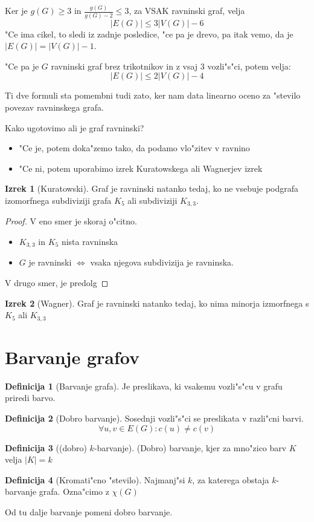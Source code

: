\documentclass{article}
\theoremstyle{definition}
\newtheorem{definition}{Definicija}[section]
\newtheorem{theorem}{Izrek}[section]
\begin{document}
	Ker je $g(G) \geq 3$ in $\frac{g(G)}{g(G)-2} \leq 3$, za VSAK ravninski graf, velja
	$$ |E(G)| \leq 3|V(G)|-6 $$
	"Ce ima cikel, to sledi iz zadnje posledice, "ce pa je drevo, pa itak vemo, da je $|E(G)| = |V(G)| - 1$.
	
	"Ce pa je $G$ ravninski graf brez trikotnikov in z vsaj 3 vozli"s"ci, potem velja:
	$$ |E(G)| \leq 2|V(G)| - 4 $$
	
	Ti dve formuli sta pomembni tudi zato, ker nam data linearno oceno za "stevilo povezav ravninskega grafa.
	
	
	Kako ugotovimo ali je graf ravninski?
	\begin{itemize}
		\item "Ce je, potem doka"zemo tako, da podamo vlo"zitev v ravnino
		\item "Ce ni, potem uporabimo izrek Kuratowskega ali Wagnerjev izrek
	\end{itemize}
	\begin{theorem}[Kuratowski]
		Graf je ravninski natanko tedaj, ko ne vsebuje podgrafa izomorfnega subdiviziji grafa $K_5$ ali subdiviziji $K_{3,3}$.
		\begin{proof}
			V eno smer je skoraj o"citno.
			\begin{itemize}
				\item $K_{3,3}$ in $K_5$ nista ravninska
				\item $G$ je ravninski $\iff$ vsaka njegova subdivizija je ravninska.
			\end{itemize}
			V drugo smer, je predolg %
		\end{proof}
	\end{theorem}
	\begin{theorem}[Wagner]
		Graf je ravninski natanko tedaj, ko nima minorja izmorfnega s $K_5$ ali $K_{3,3}$
	\end{theorem}

	\section{Barvanje grafov}
	\begin{definition}[Barvanje grafa]
		Je preslikava, ki vsakemu vozli"s"cu v grafu priredi barvo.
	\end{definition}
	\begin{definition}[Dobro barvanje]
		Sosednji vozli"s"ci se preslikata v razli"cni barvi.
		$$ \forall u,v \in E(G): c(u) \neq c(v) $$
	\end{definition}
	\begin{definition}[(dobro) $k$-barvanje]
		(Dobro) barvanje, kjer za mno"zico barv $K$ velja $|K| = k$
	\end{definition}
	\begin{definition}[Kromati"cno "stevilo]
		Najmanj"si $k$, za katerega obstaja $k$-barvanje grafa. Ozna"cimo z $\chi(G)$
	\end{definition}
	Od tu dalje barvanje pomeni dobro barvanje.
	
\end{document}
